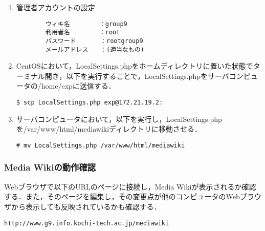 \documentclass[a4j,titlepage]{jarticle}
\begin{document}
\begin{itemize}
\begin{enumerate}
\begin{enumerate}
\item 管理者アカウントの設定
  \begin{center}
    \begin{screen}
\begin{verbatim}
        ウィキ名        ：group9
        利用者名        ：root
        パスワード　　　　：rootgroup9
        メールアドレス　　：(適当なもの)
\end{verbatim}
    \end{screen}
  \end{center}

\item CentOSにおいて，LocalSettings.phpをホームディレクトリに置いた状態でターミナル開き，以下を実行することで，LocalSettings.phpをサーバコンピュータの/home/expに送信する．
\begin{screen}
\begin{center}
\begin{verbatim}
$ scp LocalSettings.php exp@172.21.19.2:
\end{verbatim}
\end{center}
\end{screen}

\item サーバコンピュータにおいて，以下を実行し，LocalSettings.phpを/var/www/html/mediawikiディレクトリに移動させる．
\begin{screen}
\begin{center}
\begin{verbatim}
# mv LocalSettings.php /var/www/html/mediawiki
\end{verbatim}
\end{center}
\end{screen}

\end{enumerate}

\subsubsection{Media Wikiの動作確認}
Webブラウザで以下のURLのページに接続し，Media Wikiが表示されるか確認する．また，そのページを編集し，その変更点が他のコンピュータのWebブラウザから表示しても反映されているかも確認する．
\begin{screen}
\begin{center}
\begin{verbatim}
http://www.g9.info.kochi-tech.ac.jp/mediawiki
\end{verbatim}
\end{center}
\end{screen}


\end{enumerate}
\end{itemize}
\end{document}
